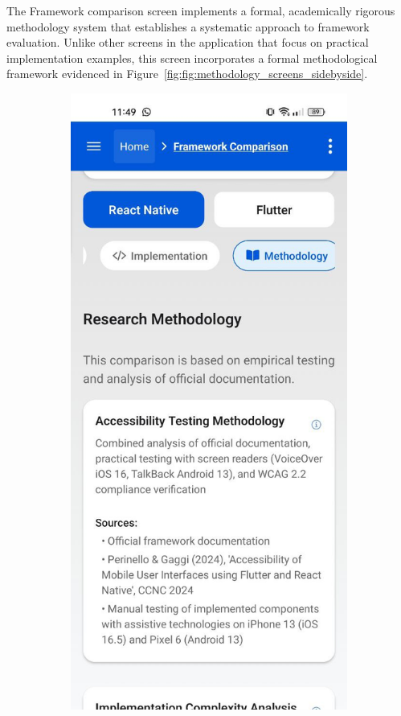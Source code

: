 The Framework comparison screen implements a formal, academically rigorous methodology system that establishes a systematic approach to framework evaluation. Unlike other screens in the application that focus on practical implementation examples, this screen incorporates a formal methodological framework evidenced in Figure~\ref{fig:fig:methodology_screens_sidebyside}.

\begin{figure}[ht]
    \centering
    \begin{subfigure}[b]{0.48\textwidth}
        \centering
        \includegraphics[width=\linewidth, alt={Methodology tab of the Framework Comparison screen}]{img/methodology1.jpg}

\end{subfigure}
\end{figure}
